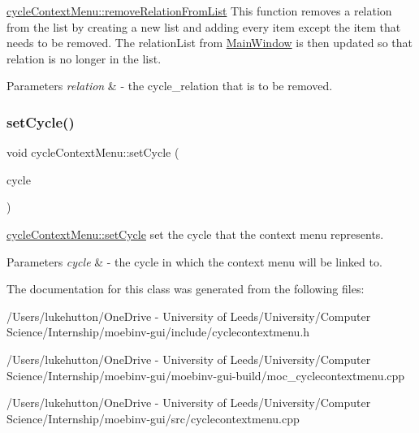 \mbox{\hyperlink{classcycle_context_menu_a83f3eb1ea5338154095a7bf1e2c77b01}{cycle\+Context\+Menu\+::remove\+Relation\+From\+List}} This function removes a relation from the list by creating a new list and adding every item except the item that needs to be removed. The \textquotesingle{}relation\+List\textquotesingle{} from \mbox{\hyperlink{class_main_window}{Main\+Window}} is then updated so that \textquotesingle{}relation\textquotesingle{} is no longer in the list. 


\begin{DoxyParams}{Parameters}
{\em relation} & -\/ the cycle\+\_\+relation that is to be removed. \\
\hline
\end{DoxyParams}
\mbox{\label{classcycle_context_menu_adf29caf51604118b6ced6a02c5172252}} 
\subsubsection{\texorpdfstring{set\+Cycle()}{setCycle()}}
{\footnotesize\ttfamily void cycle\+Context\+Menu\+::set\+Cycle (\begin{DoxyParamCaption}\item[{Gi\+Na\+C\+::ex}]{cycle }\end{DoxyParamCaption})}



\mbox{\hyperlink{classcycle_context_menu_adf29caf51604118b6ced6a02c5172252}{cycle\+Context\+Menu\+::set\+Cycle}} set the cycle that the context menu represents. 


\begin{DoxyParams}{Parameters}
{\em cycle} & -\/ the cycle in which the context menu will be \textquotesingle{}linked\textquotesingle{} to. \\
\hline
\end{DoxyParams}


The documentation for this class was generated from the following files\+:\begin{DoxyCompactItemize}
\item 
/\+Users/lukehutton/\+One\+Drive -\/ University of Leeds/\+University/\+Computer Science/\+Internship/moebinv-\/gui/include/cyclecontextmenu.\+h\item 
/\+Users/lukehutton/\+One\+Drive -\/ University of Leeds/\+University/\+Computer Science/\+Internship/moebinv-\/gui/moebinv-\/gui-\/build/moc\+\_\+cyclecontextmenu.\+cpp\item 
/\+Users/lukehutton/\+One\+Drive -\/ University of Leeds/\+University/\+Computer Science/\+Internship/moebinv-\/gui/src/cyclecontextmenu.\+cpp\end{DoxyCompactItemize}
